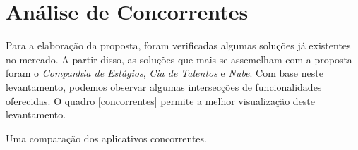 \chapter{Análise de Concorrentes}
Para a elaboração da proposta, foram verificadas algumas soluções já existentes no mercado. A partir disso, as soluções que mais se assemelham com a proposta foram o \textit{Companhia de Estágios}, \textit{Cia de Talentos} e
\textit{Nube}. Com base neste levantamento, podemos observar algumas intersecções de funcionalidades oferecidas. O quadro \ref{concorrentes} permite a melhor visualização deste levantamento.

\begin{quadro}[h]
\caption{Uma comparação dos aplicativos concorrentes.}
\centering
  \label{concorrentes}
\end{quadro}

